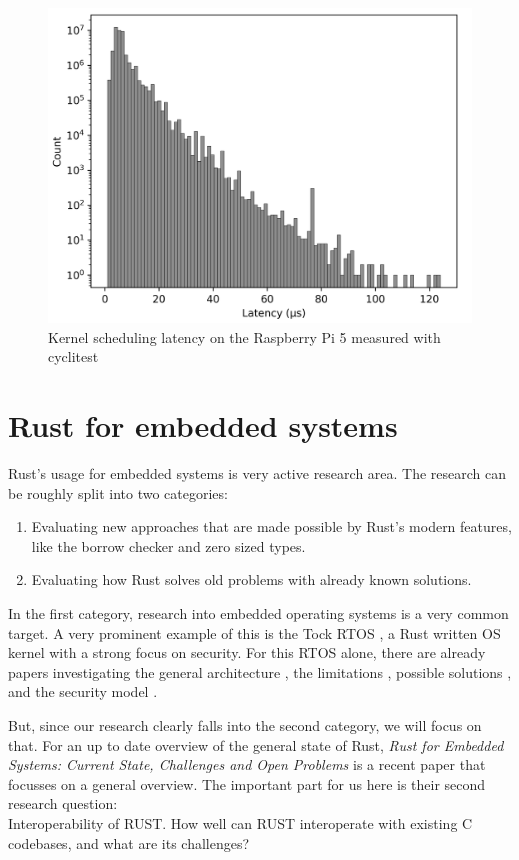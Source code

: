 \begin{figure}
  \begin{center}
    \includegraphics[width=.8\textwidth]{assets/Rasp5.png}
    \caption{Kernel scheduling latency on the Raspberry Pi 5 measured with cyclitest \cite{Rasp5}}
    \label{fig:rasp5}
  \end{center}
\end{figure}

\section{Rust for embedded systems}

Rust's usage for embedded systems is very active research area.
The research can be roughly split into two categories:
\begin{enumerate}
  \item Evaluating new approaches that are made possible by Rust's modern features, like the borrow checker and zero sized types.
  \item Evaluating how Rust solves old problems with already known solutions.
\end{enumerate}

In the first category, research into embedded operating systems is a very common target.
A very prominent example of this is the Tock RTOS \cite{tock}, a Rust written OS kernel with a strong focus on security.
For this RTOS alone, there are already papers investigating the general architecture \cite{tock2}, the limitations \cite{theft}, possible solutions \cite{tock3}, and the security model \cite{tock4}.

But, since our research clearly falls into the second category, we will focus on that.
For an up to date overview of the general state of Rust, \textit{Rust for Embedded Systems: Current State, Challenges and Open Problems} \cite{sharma2023rustembeddedsystemscurrent} is a recent paper that focusses on a general overview.
The important part for us here is their second research question:\\
Interoperability of RUST. How well can RUST interoperate with existing C codebases, and what are its challenges?

